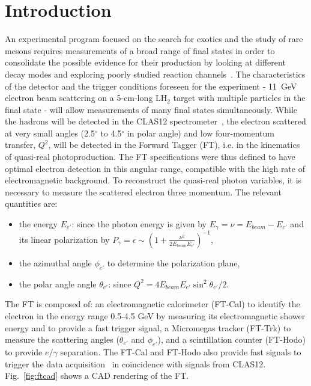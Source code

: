 \section{Introduction}

An experimental program focused on the search for exotics and the study of rare mesons requires measurements
of a broad range of final states in order to consolidate the possible evidence for their production by looking at different
decay modes and exploring poorly studied reaction channels~\cite{mesonex}. The characteristics of the detector
and the trigger conditions foreseen for the experiment - 11~GeV electron beam scattering on a 5-cm-long LH$_2$
target with multiple particles in the final state - will allow  measurements of many final states simultaneously. While
the hadrons will be detected in the CLAS12 spectrometer~\cite{overview}, the electron scattered at very small
angles (2.5$^\circ$ to 4.5$^\circ$ in polar angle) and low four-momentum transfer, $Q^2$,  will be detected in the
Forward Tagger (FT), i.e. in the kinematics of quasi-real photoproduction. The FT  specifications were thus defined
to have optimal electron detection in this angular range, compatible with the high rate of electromagnetic background. To
reconstruct the  quasi-real photon variables, it is necessary to measure the scattered electron three momentum.
The relevant quantities are:

\begin{itemize}
\item the energy $E_{e'}$: since the photon energy is given by $E_\gamma =\nu=E_{beam}-E_{e'}$ and its linear
  polarization by $P_\gamma=\epsilon\sim\left( 1+\frac{\nu^2}{2 E_{beam} E_{e'}}\right)^{-1}$,
\item the azimuthal angle $\phi_{e'}$ to determine the polarization plane, 
\item the polar angle angle $\theta_{e'}$: since $Q^2 = 4 E_{beam} E_{e'} \sin^2{\theta_{e'}/2}$.
\end{itemize}

The FT is composed of: an electromagnetic calorimeter  (FT-Cal) to identify the electron in the energy range 0.5-4.5 GeV by measuring its
electromagnetic shower energy and to provide a fast trigger signal, a Micromegas tracker (FT-Trk) to measure
the scattering angles ($\theta_{e'}$ and $\phi_{e'}$), and a  scintillation counter (FT-Hodo) to provide $e/\gamma$
separation. The FT-Cal and FT-Hodo also provide fast signals to trigger the data acquisition~\cite{daq} in coincidence
with signals from CLAS12. Fig.~\ref{fig:ftcad} shows a CAD rendering of the FT.

